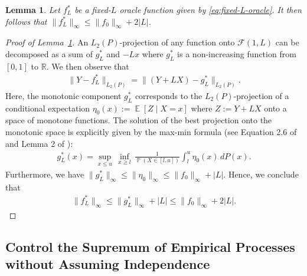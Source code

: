 \documentclass[12pt]{article}
\DeclareMathOperator*{\E}{\mathbb{E}}
\DeclareMathOperator*{\Prob}{\mathbb{P}}
\newtheorem{lemma}[theorem]{Lemma}
\begin{document}
\begin{appendices}
\begin{lemma}\label{lemma:boundedness_L2-projection}
Let $f_{L}^*$ be a fixed-$L$ oracle function given by \eqref{eq:fixed-L-oracle}. It then follows that $\|f^*_{L}\|_\infty \le \|f_0\|_\infty + 2|L|$.
\end{lemma}
\begin{proof}[Proof of Lemma~\ref{lemma:boundedness_L2-projection}]
	An $L_2(P)$-projection of any function onto $\mathcal{F}(1, L)$ can be decomposed as a sum of $g^*_{L}$ and $-Lx$ where $g^*_{L}$ is a non-increasing function from $[0,1]$ to $\mathbb{R}$. We then observe that  
	\begin{align}
		\|Y-f^*_{L}\|_{L_2(P)} = \|(Y+LX)-g^*_{L}\|_{L_2(P)}.\nonumber
	\end{align}
	Here, the monotonic component $g^*_{L}$ corresponds to the $L_2(P)$-projection of a conditional expectation $\eta_0(x) := \E[Z\mid X=x]$ where $Z:=Y+LX$ onto a space of monotone functions. The solution of the best projection onto the monotonic space is explicitly given by the max-min formula (see Equation 2.6 of \cite{mammen1991estimating} and Lemma 2 of \cite{anevski2011monotone}):
	\begin{align}
		g^*_{L}(x) = \sup_{x \le u}\, \inf_{x \ge l}\, \frac{1}{\Prob(X\in[l, u])}\int_{l}^u\eta_0(x)\, dP(x)\nonumber.
	\end{align}
	Furthermore, we have $\|g^*_{L}\|_\infty \le \|\eta_0\|_\infty \le \|f_0\|_\infty + |L|$.
	Hence, we conclude that 
	\begin{align}
		\|f^*_{L}\|_\infty \le \|g^*_{L}\|_\infty +|L| \le \|f_{0}\|_\infty +2|L|\nonumber.
	\end{align}
	\end{proof}


\subsection{Control the Supremum of Empirical Processes without Assuming Independence}
\label{supp:empirical-process}


\end{appendices}
\end{document}
